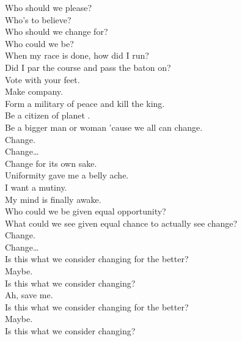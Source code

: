\label{album:changes}




Who should we please? \\
Who's to believe? \\
Who should we change for? \\
Who could we be? \\
When my race is done, how did I run? \\
Did I par the course and pass the baton on? \\

Vote with your feet. \\
Make company. \\
Form a military of peace and kill the king. \\
Be a citizen of planet . \\
Be a bigger man or woman 'cause we all can change. \\

Change. \\
Change… \\

Change for its own sake. \\
Uniformity gave me a belly ache. \\
I want a mutiny. \\
My mind is finally awake. \\
Who could we be given equal opportunity? \\
What could we see given equal chance to actually see change? \\

Change. \\
Change… \\

Is this what we consider changing for the better? \\
Maybe. \\

Is this what we consider changing? \\
Ah, save me. \\
Is this what we consider changing for the better? \\
Maybe. \\
Is this what we consider changing? \\

